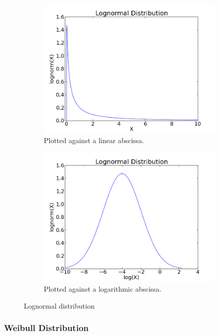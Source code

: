 \begin{figure}
\centering
\begin{subfigure}{.5\textwidth}
  \centering
  \includegraphics[width=.8\linewidth]{../Images/LogNormal_Linear.png}
  \caption{Plotted against a linear abscissa.}
  \label{fig:Lognormal_Sub1}
\end{subfigure}%
\begin{subfigure}{.5\textwidth}
  \centering
  \includegraphics[width=.8\linewidth]{../Images/LogNormal_Logarithmic.png}
  \caption{Plotted against a logarithmic abscissa.}
  \label{fig:Lognormal_Sub2}
\end{subfigure}
\caption{Lognormal distribution}
\label{fig:lognormal}
\end{figure}

\subsubsection{Weibull Distribution}

